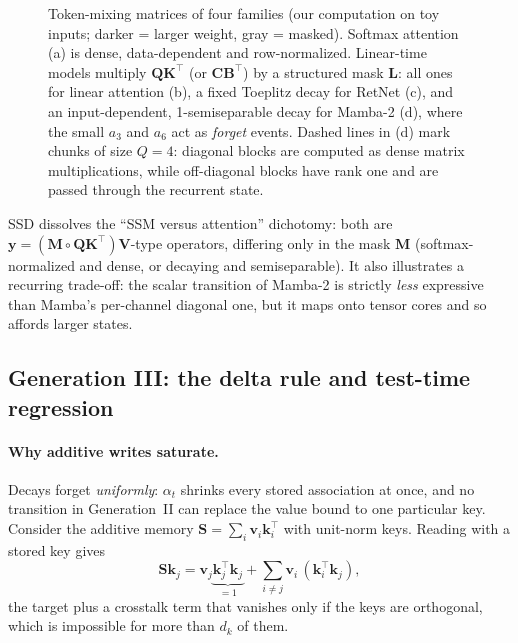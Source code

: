 \documentclass[a4paper]{article}
\newcommand{\T}{^{\top}}
\newcommand{\vk}{\mathbf{k}}
\newcommand{\vv}{\mathbf{v}}
\newcommand{\vy}{\mathbf{y}}
\newcommand{\mB}{\mathbf{B}}
\newcommand{\mC}{\mathbf{C}}
\newcommand{\mS}{\mathbf{S}}
\newcommand{\mM}{\mathbf{M}}
\newcommand{\mL}{\mathbf{L}}
\theoremstyle{plain}
\theoremstyle{remark}
\begin{document}
\begin{figure}[t]
\caption{\label{fig:masks}Token-mixing matrices of four families (our computation on toy inputs; darker = larger weight, gray = masked). Softmax attention (a) is dense, data-dependent and row-normalized. Linear-time models multiply $\mathbf{QK}\T$ (or $\mC\mB\T$) by a structured mask $\mL$: all ones for linear attention (b), a fixed Toeplitz decay for RetNet (c), and an input-dependent, 1-semiseparable decay for Mamba-2 (d), where the small $a_3$ and $a_6$ act as \emph{forget} events. Dashed lines in (d) mark chunks of size $Q{=}4$: diagonal blocks are computed as dense matrix multiplications, while off-diagonal blocks have rank one and are passed through the recurrent state.}
\end{figure}

\begin{takeaway}[Takeaway.]
SSD dissolves the \textquotedblleft SSM versus attention\textquotedblright{} dichotomy: both are $\vy=(\mM\circ\mathbf{Q}\mathbf{K}\T)\mathbf{V}$-type operators, differing only in the mask $\mM$ (softmax-normalized and dense, or decaying and semiseparable). It also illustrates a recurring trade-off: the scalar transition of Mamba-2 is strictly \emph{less} expressive than Mamba's per-channel diagonal one, but it maps onto tensor cores and so affords larger states.
\end{takeaway}

\subsection{Generation III: the delta rule and test-time regression}
\label{sec:gen3}
\paragraph{Why additive writes saturate.} Decays forget \emph{uniformly}: $\alpha_t$ shrinks every stored association at once, and no transition in Generation~II can replace the value bound to one particular key. Consider the additive memory $\mS=\sum_i\vv_i\vk_i\T$ with unit-norm keys. Reading with a stored key gives
\begin{equation}
\label{eq:crosstalk}
\mS\vk_j=\vv_j\underbrace{\vk_j\T\vk_j}_{=1}+\sum_{i\neq j}\vv_i\,(\vk_i\T\vk_j),
\end{equation}
the target plus a crosstalk term that vanishes only if the keys are orthogonal, which is impossible for more than $d_k$ of them.
\end{document}

